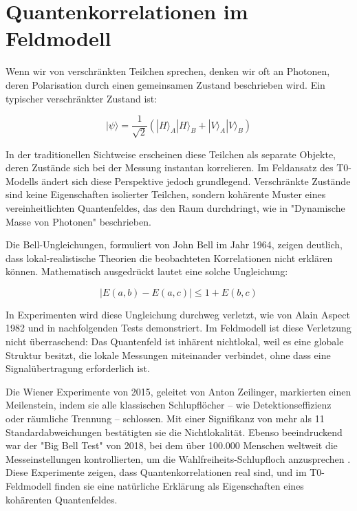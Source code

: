 \documentclass[a4paper,12pt]{article}
\theoremstyle{definition}
\theoremstyle{remark}
\begin{document}
	\section{Quantenkorrelationen im Feldmodell}
	
	Wenn wir von verschränkten Teilchen sprechen, denken wir oft an Photonen, deren Polarisation durch einen gemeinsamen Zustand beschrieben wird. Ein typischer verschränkter Zustand ist:
	
	\begin{equation}
		|\psi\rangle = \frac{1}{\sqrt{2}} (|H\rangle_A |H\rangle_B + |V\rangle_A |V\rangle_B)
	\end{equation}
	
	In der traditionellen Sichtweise erscheinen diese Teilchen als separate Objekte, deren Zustände sich bei der Messung instantan korrelieren. Im Feldansatz des T0-Modells ändert sich diese Perspektive jedoch grundlegend. Verschränkte Zustände sind keine Eigenschaften isolierter Teilchen, sondern kohärente Muster eines vereinheitlichten Quantenfeldes, das den Raum durchdringt, wie in "Dynamische Masse von Photonen" \cite{pascher_photons_2025} beschrieben.
	
	Die Bell-Ungleichungen, formuliert von John Bell im Jahr 1964, zeigen deutlich, dass lokal-realistische Theorien die beobachteten Korrelationen nicht erklären können. Mathematisch ausgedrückt lautet eine solche Ungleichung:
	
	\begin{equation}
		|E(a,b) - E(a,c)| \leq 1 + E(b,c)
	\end{equation}
	
	In Experimenten wird diese Ungleichung durchweg verletzt, wie von Alain Aspect 1982 und in nachfolgenden Tests \cite{Aspect1982} demonstriert. Im Feldmodell ist diese Verletzung nicht überraschend: Das Quantenfeld ist inhärent nichtlokal, weil es eine globale Struktur besitzt, die lokale Messungen miteinander verbindet, ohne dass eine Signalübertragung erforderlich ist.
	
	Die Wiener Experimente von 2015, geleitet von Anton Zeilinger, markierten einen Meilenstein, indem sie alle klassischen Schlupflöcher – wie Detektionseffizienz oder räumliche Trennung \cite{Giustina2015} – schlossen. Mit einer Signifikanz von mehr als 11 Standardabweichungen bestätigten sie die Nichtlokalität. Ebenso beeindruckend war der "Big Bell Test" von 2018, bei dem über 100.000 Menschen weltweit die Messeinstellungen kontrollierten, um die Wahlfreiheits-Schlupfloch anzusprechen \cite{BigBellTest2018}. Diese Experimente zeigen, dass Quantenkorrelationen real sind, und im T0-Feldmodell finden sie eine natürliche Erklärung als Eigenschaften eines kohärenten Quantenfeldes.
	
\end{document}

